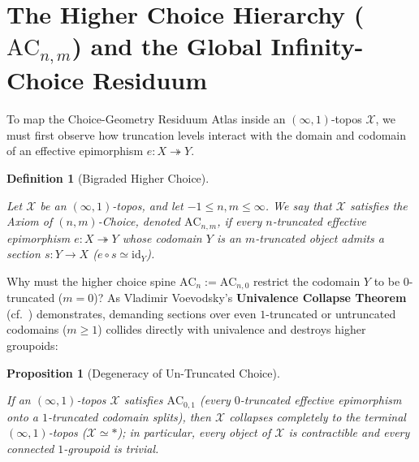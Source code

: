 \documentclass[10pt,twoside,openright]{book}
\theoremstyle{crmplain}
\newtheorem{proposition}[theorem]{Proposition}
\theoremstyle{crmdef}
\newtheorem{definition}[theorem]{Definition}
\theoremstyle{crmremark}
\begin{document}
\section{\texorpdfstring{The Higher Choice Hierarchy ($\mathrm{AC}_{n, m}$) and the Global Infinity-Choice Residuum}{The Higher Choice Hierarchy (ACn, m) and the Global Infinity-Choice Residuum}}\label{sec:higher-choice}

To map the Choice-Geometry Residuum Atlas inside an $(\infty, 1)$-topos $\mathcal{X}$, we must first observe how truncation levels interact with the domain and codomain of an effective epimorphism $e: X \twoheadrightarrow Y$.

\begin{definition}[Bigraded Higher Choice]\label{def:bigraded-choice}

Let $\mathcal{X}$ be an $(\infty, 1)$-topos, and let $-1 \le n, m \le \infty$. We say that $\mathcal{X}$ satisfies the Axiom of $(n, m)$-Choice, denoted $\mathrm{AC}_{n, m}$, if every $n$-truncated effective epimorphism $e: X \twoheadrightarrow Y$ whose codomain $Y$ is an $m$-truncated object admits a section $s: Y \to X$ ($e \circ s \simeq \mathrm{id}_Y$).

\end{definition}

Why must the higher choice spine $\mathrm{AC}_n := \mathrm{AC}_{n, 0}$ restrict the codomain $Y$ to be $0$-truncated ($m = 0$)? As Vladimir Voevodsky's \textbf{Univalence Collapse Theorem}~\cite[Ex.~3.8.5]{HoTT13} (cf.~\cite[\S\S 5.5.6, 6.5]{Lurie09}) demonstrates, demanding sections over even $1$-truncated or untruncated codomains ($m \ge 1$) collides directly with univalence and destroys higher groupoids:

\begin{proposition}[Degeneracy of Un-Truncated Choice]\label{prop:untruncated-degeneracy}

If an $(\infty, 1)$-topos $\mathcal{X}$ satisfies $\mathrm{AC}_{0, 1}$ (every $0$-truncated effective epimorphism onto a $1$-truncated codomain splits), then $\mathcal{X}$ collapses completely to the terminal $(\infty, 1)$-topos ($\mathcal{X} \simeq *$); in particular, every object of $\mathcal{X}$ is contractible and every connected $1$-groupoid is trivial.

\end{proposition}
\end{document}
